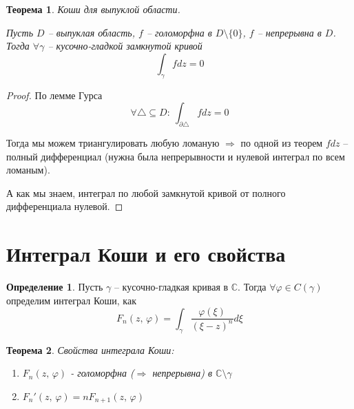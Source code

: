 \documentclass[a4paper,12pt]{article}
\renewcommand{\phi}{\ensuremath{\varphi}}
\theoremstyle{plain}
\newtheorem{theorem}{Теорема}[section]
\theoremstyle{definition}
\newtheorem{definition}{Определение}[section]
\theoremstyle{remark}
\begin{document}
\begin{theorem}
  Коши для выпуклой области.

  Пусть $D$ -- выпуклая область, $f$ -- голоморфна в $D \setminus \{0\}$, $f$ -- непрерывна в $D$. Тогда $\forall \gamma$ -- кусочно-гладкой замкнутой кривой
  \[
    \int_\gamma fdz = 0
  \]
\end{theorem}

\begin{proof}
  По лемме Гурса
  \[
    \forall \triangle \subseteq D :\: \int_{\partial \triangle} fdz = 0  
  \]

  Тогда мы можем триангулировать любую ломаную $\Rightarrow$ по одной из теорем $fdz$ -- полный дифференциал (нужна была непрерывности и нулевой интеграл по всем ломаным).

  А как мы знаем, интеграл по любой замкнутой кривой от полного дифференциала нулевой.
\end{proof}

\section{Интеграл Коши и его свойства}
\begin{definition}
  Пусть $\gamma$ -- кусочно-гладкая кривая в $\mathbb{C}$. Тогда $\forall \phi \in C(\gamma)$ определим интеграл Коши, как
  \[
    F_n(z,\, \phi) = \int_\gamma \frac{\phi(\xi)}{(\xi - z)^n}d\xi
  \]
\end{definition}

\begin{theorem}
  Свойства интеграла Коши:
  \begin{enumerate}
    \item $F_n(z,\, \phi)$ - голоморфна ($\Rightarrow$ непрерывна) в $\mathbb{C} \setminus \gamma$
    \item $F_n'(z,\, \phi) = nF_{n + 1}(z,\, \phi)$
  \end{enumerate}
\end{theorem}
\end{document}

